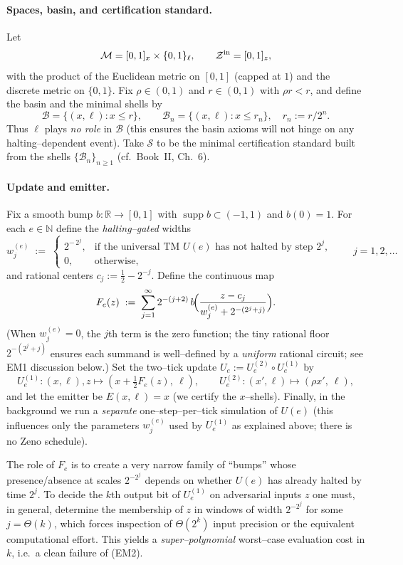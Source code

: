 \documentclass[12pt]{article}
\theoremstyle{definition}
\theoremstyle{plain}
\begin{document}
\paragraph{Spaces, basin, and certification standard.}
Let
\[
  \mathcal M=[0,1]_x\times\{0,1\}_\ell,\qquad
  \mathcal Z^{\rm in}=[0,1]_z,
\]
with the product of the Euclidean metric on $[0,1]$ (capped at $1$) and the discrete metric on $\{0,1\}$. Fix $\rho\in(0,1)$ and $r\in(0,1)$ with $\rho r<r$, and define the basin and the minimal shells by
\[
  \mathcal B=\{(x,\ell):x\le r\},\qquad
  \mathcal B_n=\{(x,\ell):x\le r_n\},\quad r_n:=r/2^n.
\]
Thus $\ell$ plays \emph{no role} in $\mathcal B$ (this ensures the basin axioms will not hinge on any halting–dependent event). Take $\mathcal S$ to be the minimal certification standard built from the shells $\{\mathcal B_n\}_{n\ge1}$ (cf.\ Book~II, Ch.~6).

\paragraph{Update and emitter.}
Fix a smooth bump $b:\mathbb R\to[0,1]$ with $\operatorname{supp}b\subset(-1,1)$ and $b(0)=1$. For each $e\in\mathbb N$ define the \emph{halting–gated} widths
\[
  w_j^{(e)} \;:=\;
  \begin{cases}
    2^{-\,2^{j}}, & \text{if the universal TM $U(e)$ has not halted by step }2^{j},\\[2pt]
    0, & \text{otherwise},
  \end{cases}
  \qquad j=1,2,\dots
\]
and rational centers $c_j:=\tfrac12-2^{-j}$. Define the continuous map
\[
  F_e(z) \;:=\; \sum_{j=1}^\infty 2^{-(j+2)}\, b\!\Bigl(\frac{z-c_j}{w_j^{(e)}+2^{-(2^{j}+j)}}\Bigr).
\]
(When $w_j^{(e)}=0$, the $j$th term is the zero function; the tiny rational floor $2^{-(2^{j}+j)}$ ensures each summand is well–defined by a \emph{uniform} rational circuit; see EM1 discussion below.)
Set the two–tick update $U_e:=U_e^{(2)}\circ U_e^{(1)}$ by
\[
  U_e^{(1)}:(x,\ell),z\mapsto (x+\tfrac12 F_e(z),\ \ell),\qquad
  U_e^{(2)}:(x',\ell)\mapsto (\rho x',\ \ell),
\]
and let the emitter be $E(x,\ell)=x$ (we certify the $x$–shells). Finally, in the background we run a \emph{separate} one–step–per–tick simulation of $U(e)$ (this influences only the parameters $w_j^{(e)}$ used by $U_e^{(1)}$ as explained above; there is no Zeno schedule).

\medskip
The role of $F_e$ is to create a very narrow family of ``bumps'' whose presence/absence at scales $2^{-2^{j}}$ depends on whether $U(e)$ has already halted by time $2^{j}$. To decide the $k$th output bit of $U_e^{(1)}$ on adversarial inputs $z$ one must, in general, determine the membership of $z$ in windows of width $2^{-2^{j}}$ for some $j=\Theta(k)$, which forces inspection of $\Theta(2^{k})$ input precision or the equivalent computational effort. This yields a \emph{super–polynomial} worst–case evaluation cost in $k$, i.e.\ a clean failure of \textup{(EM2)}.
\end{document}
